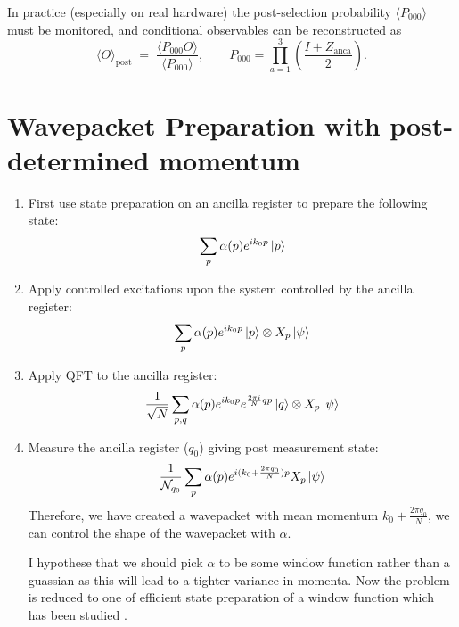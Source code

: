 \documentclass[11pt]{article}
\begin{document}
In practice (especially on real hardware) the post-selection probability
$\langle P_{000}\rangle$ must be monitored, and conditional observables can be
reconstructed as
\begin{equation}
\langle O\rangle_{\mathrm{post}}
\;=\;
\frac{\langle P_{000} O\rangle}{\langle P_{000}\rangle},
\qquad
P_{000}
=
\prod_{a=1}^3 \left(\frac{I+Z_{\mathrm{anca}}}{2}\right).
\end{equation}
\pagebreak

\section{Wavepacket Preparation with post-determined momentum}
\begin{enumerate}
    \item First use state preparation on an ancilla register to prepare the following state:
    \begin{equation}
        \sum_p \alpha(p) e^{i k_0 p}\ket{p}
    \end{equation}
    \item Apply controlled excitations upon the system controlled by the ancilla register:
    \begin{equation}
        \sum_p \alpha(p) e^{i k_0 p}\ket{p}\otimes X_p \ket{\psi}
    \end{equation}
    \item Apply QFT to the ancilla register:
    \begin{equation}
        \frac{1}{\sqrt{N}}\sum_{p,q} \alpha(p) e^{i k_0 p}e^{\frac{2\pi i}{N}qp}\ket{q}\otimes X_p \ket{\psi}
    \end{equation}
    \item Measure the ancilla register ($q_0$) giving post measurement state:
    \begin{equation}
        \frac{1}{\mathcal{N}_{q_0}}\sum_{p} \alpha(p) e^{i (k_0+\frac{2\pi q_0}{N} )p} X_p \ket{\psi}
    \end{equation}
    Therefore, we have created a wavepacket with mean momentum $k_0+\frac{2\pi q_0}{N}$, we can control the shape of the wavepacket with $\alpha$. 
    
    
    I hypothese that we should pick $\alpha$ to be some window function rather than a guassian as this will lead to a tighter variance in momenta. Now the problem is reduced to one of efficient state preparation of a window function which has been studied \cite{mcardle2022quantum, o2025quantum}.
\end{enumerate}
\end{document}
